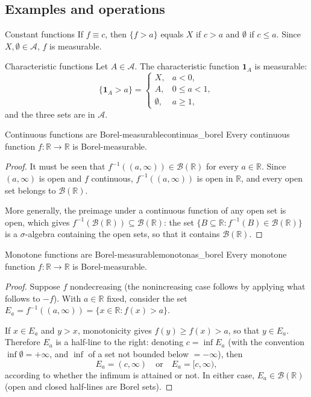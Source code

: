 \documentclass[11pt, a4paper]{article}
\begin{document}
\subsection{Examples and operations}

\begin{ejemplo}{Constant functions}{}
If $f \equiv c$, then $\{f > a\}$ equals $X$ if $c > a$ and $\emptyset$ if $c \le a$. Since
$X, \emptyset \in \mathcal{A}$, $f$ is measurable.
\end{ejemplo}

\begin{ejemplo}{Characteristic functions}{}
Let $A \in \mathcal{A}$. The characteristic function $\mathbf{1}_A$ is measurable:
$$ \{\mathbf{1}_A > a\} = \begin{cases} X, & a < 0, \\ A, & 0 \le a < 1, \\ \emptyset,
& a \ge 1, \end{cases} $$
and the three sets are in $\mathcal{A}$.
\end{ejemplo}

\begin{teorema}{Continuous functions are Borel-measurable}{continuas_borel}
Every continuous function $f: \mathbb{R} \to \mathbb{R}$ is Borel-measurable.
\end{teorema}

\begin{proof}
It must be seen that $f^{-1}((a, \infty)) \in \mathcal{B}(\mathbb{R})$ for every $a \in \mathbb{R}$.
Since $(a, \infty)$ is open and $f$ continuous, $f^{-1}((a, \infty))$ is open in $\mathbb{R}$, and
every open set belongs to $\mathcal{B}(\mathbb{R})$.

More generally, the preimage under a continuous function of any open set is open, which gives
$f^{-1}(\mathcal{B}(\mathbb{R})) \subseteq \mathcal{B}(\mathbb{R})$: the set $\{B \subseteq
\mathbb{R} : f^{-1}(B) \in \mathcal{B}(\mathbb{R})\}$ is a $\sigma$-algebra containing the
open sets, so that it contains $\mathcal{B}(\mathbb{R})$.
\end{proof}

\begin{teorema}{Monotone functions are Borel-measurable}{monotonas_borel}
Every monotone function $f: \mathbb{R} \to \mathbb{R}$ is Borel-measurable.
\end{teorema}

\begin{proof}
Suppose $f$ nondecreasing (the nonincreasing case follows by applying what follows to $-f$). With
$a \in \mathbb{R}$ fixed, consider the set
$E_a = f^{-1}((a, \infty)) = \{x \in \mathbb{R} : f(x) > a\}$.

If $x \in E_a$ and $y > x$, monotonicity gives $f(y) \ge f(x) > a$, so that $y \in E_a$.
Therefore $E_a$ is a half-line to the right: denoting $c = \inf E_a$ (with the convention
$\inf \emptyset = +\infty$, and $\inf$ of a set not bounded below $= -\infty$), then
$$ E_a = (c, \infty) \quad \text{or} \quad E_a = [c, \infty), $$
according to whether the infimum is attained or not. In either case, $E_a \in
\mathcal{B}(\mathbb{R})$ (open and closed half-lines are Borel sets).
\end{proof}
\end{document}
